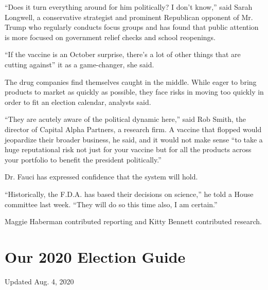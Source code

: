 ``Does it turn everything around for him politically? I don't know,''
said Sarah Longwell, a conservative strategist and prominent Republican
opponent of Mr. Trump who regularly conducts focus groups and has found
that public attention is more focused on government relief checks and
school reopenings.

``If the vaccine is an October surprise, there's a lot of other things
that are cutting against'' it as a game-changer, she said.

The drug companies find themselves caught in the middle. While eager to
bring products to market as quickly as possible, they face risks in
moving too quickly in order to fit an election calendar, analysts said.

``They are acutely aware of the political dynamic here,'' said Rob
Smith, the director of Capital Alpha Partners, a research firm. A
vaccine that flopped would jeopardize their broader business, he said,
and it would not make sense ``to take a huge reputational risk not just
for your vaccine but for all the products across your portfolio to
benefit the president politically.''

Dr. Fauci has expressed confidence that the system will hold.

``Historically, the F.D.A. has based their decisions on science,'' he
told a House committee last week. ``They will do so this time also, I am
certain.''

Maggie Haberman contributed reporting and Kitty Bennett contributed
research.

\hypertarget{our-2020-election-guide}{%
\section{Our 2020 Election Guide}\label{our-2020-election-guide}}

Updated Aug. 4, 2020

